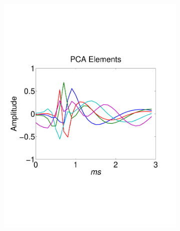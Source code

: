 
\begin{center}
\begin{figure}[h!]
\begin{subfigure}[b]{.3\textwidth}
\includegraphics[width=\textwidth]{../figs/new/pcaelements.pdf}
\caption{}
\label{fig:ICold}
\end{subfigure}
\begin{subfigure}[b]{.3\textwidth}
\caption{}
\label{fig:ICold}
\end{subfigure}
\begin{subfigure}[b]{.3\textwidth}
\caption{}
\label{fig:ICold}
\end{subfigure}
\caption{ 
} \label{fig:timing}
\end{figure}
\end{center}

